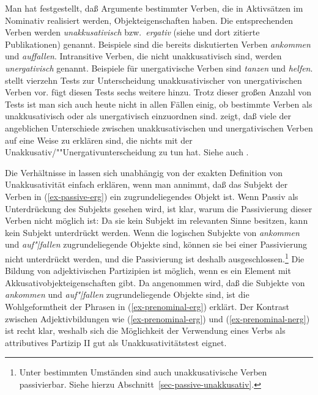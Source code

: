 \noindent
Man hat festgestellt, daß Argumente bestimmter Verben, die in Aktivsätzen im Nominativ realisiert
werden, Objekteigenschaften haben. Die entsprechenden Verben werden \emph{unakkusativisch}
\citep{Perlmutter78} bzw.\ \emph{ergativ} (siehe \zb {} und dort
zitierte Publikationen\nocite{Pullum88a}) genannt. Beispiele sind die bereits diskutierten Verben
\emph{ankommen} und \emph{auffallen}. Intransitive Verben, die nicht unakkusativisch sind, werden
\emph{unergativisch} genannt. Beispiele für unergativische Verben sind
\emph{tanzen} und \emph{helfen}. \citet{Grewendorf89a} stellt
vierzehn Tests zur Unterscheidung unakkusativischer von unergativischen Verben vor.
\citet{Fanselow92} fügt diesen Tests sechs weitere hinzu.  Trotz dieser großen Anzahl
von Tests ist man sich auch heute nicht in allen Fällen einig, ob bestimmte Verben als
unakkusativisch oder als unergativisch einzuordnen sind.
\citet{Kaufmann95a}
zeigt, daß viele der angeblichen Unterschiede zwischen unakkusativischen und unergativischen Verben
auf eine Weise zu erklären sind, die nichts mit der Unakkusativ/""Unergativunterscheidung zu tun
hat. Siehe auch .

Die Verhältnisse in  lassen sich unabhängig von
der exakten Definition von Unakkusativität einfach erklären, wenn man annimmt,
daß das Subjekt der Verben in (\ref{ex-passive-erg}) ein zugrundeliegendes Objekt ist.
Wenn Passiv als Unterdrückung des Subjekts gesehen wird, ist klar, warum die Passivierung dieser
Verben nicht möglich ist: Da sie kein Subjekt im relevanten Sinne besitzen, kann kein Subjekt
unterdrückt werden. Wenn die logischen Subjekte von \emph{ankommen} und \emph{auf"|fallen}
zugrundeliegende Objekte sind, können sie bei einer Passivierung nicht unterdrückt werden,
und die Passivierung ist deshalb ausgeschlossen.\footnote{
        Unter bestimmten Umständen sind auch unakkusativische Verben
        passivierbar. Siehe hierzu Abschnitt~\ref{sec-passive-unakkusativ}.
}
Die Bildung von adjektivischen Partizipien ist möglich, wenn es ein Element mit
Akkusativobjekteigenschaften gibt. Da angenommen wird, daß die Subjekte
von \emph{ankommen} und \emph{auf"|fallen} zugrundeliegende Objekte sind,
ist die Wohlgeformtheit der Phrasen in (\ref{ex-prenominal-erg}) erklärt. Der Kontrast zwischen
Adjektivbildungen wie (\ref{ex-prenominal-erg}) und (\ref{ex-prenominal-nerg}) ist recht klar,
weshalb sich die Möglichkeit der Verwendung eines Verbs als attributives Partizip II gut als
Unakkusativitätstest eignet.%


